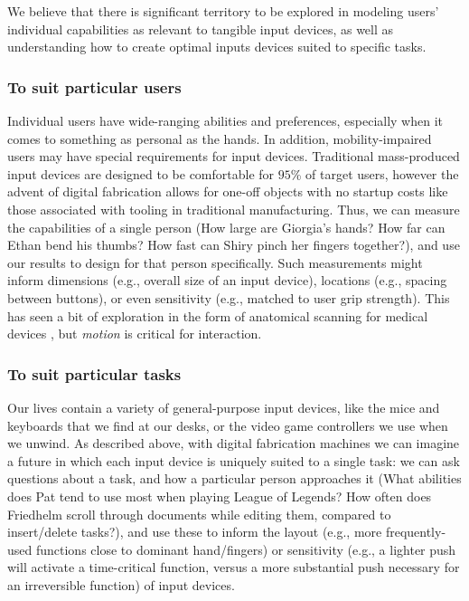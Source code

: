 We believe that there is significant territory to be explored in modeling users' individual capabilities as relevant to tangible input devices, as well as understanding how to create optimal inputs devices suited to specific tasks.

    \subsubsection{To suit particular users}

    Individual users have wide-ranging abilities and preferences, especially when it comes to something as personal as the hands. In addition, mobility-impaired users may have special requirements for input devices. Traditional mass-produced input devices are designed to be comfortable for $95$\% of target users, however the advent of digital fabrication allows for one-off objects with no startup costs like those associated with tooling in traditional manufacturing. Thus, we can measure the capabilities of a single person (How large are Giorgia's hands? How far can Ethan bend his thumbs? How fast can Shiry pinch her fingers together?), and use our results to design for that person specifically. Such measurements might inform dimensions (e.g., overall size of an input device), locations (e.g., spacing between buttons), or even sensitivity (e.g., matched to user grip strength). This has seen a bit of exploration in the form of anatomical scanning for medical devices \cite{smakman-curatio}, but \emph{motion} is critical for interaction.

    \subsubsection{To suit particular tasks}
    
    Our lives contain a variety of general-purpose input devices, like the mice and keyboards that we find at our desks, or the video game controllers we use when we unwind. As described above, with digital fabrication machines we can imagine a future in which each input device is uniquely suited to a single task: we can ask questions about a task, and how a particular person approaches it (What abilities does Pat tend to use most when playing League of Legends? How often does Friedhelm scroll through documents while editing them, compared to insert/delete tasks?), and use these to inform the layout (e.g., more frequently-used functions close to dominant hand/fingers) or sensitivity (e.g., a lighter push will activate a time-critical function, versus a more substantial push necessary for an irreversible function) of input devices.
    
